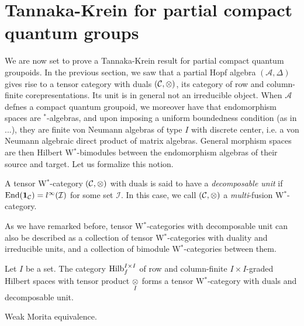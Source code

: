 \section{Tannaka-Krein for partial compact quantum groups}



We are now set to prove a Tannaka-Krein result for partial compact quantum groupoids. In the previous section, we saw that a partial Hopf algebra $(\mathscr{A},\Delta)$ gives rise to a tensor category with duals $(\mathcal{C},\otimes)$, its category of row and column-finite corepresentations. Its unit is in general not an irreducible object. When $\mathscr{A}$ defnes a compact quantum groupoid, we moreover have that endomorphism spaces are $^*$-algebras, and upon imposing a uniform boundedness condition (as in ...), they are finite von Neumann algebras of type $I$ with discrete center, i.e. a von Neumann algebraic direct product of matrix algebras. General morphism spaces are then Hilbert W$^*$-bimodules between the endomorphism algebras of their source and target. Let us formalize this notion. %


\begin{Def} A tensor W$^*$-category $(\mathcal{C},\otimes)$ with duals is said to have a \emph{decomposable unit} if $\operatorname{\mathrm{End}}(\mathbf{1}_{\mathcal{C}}) = l^{\infty}(\mathcal{I})$ for some set $\mathcal{I}$. In this case, we call $(\mathcal{C},\otimes)$ a \emph{multi}-fusion W$^*$-category. %
\end{Def}

As we have remarked before, tensor W$^*$-categories with decomposable unit can also be described as a collection of tensor W$^*$-categories with duality and irreducible units, and a collection of bimodule W$^*$-categories between them. 

\begin{Exa} Let $I$ be a set. The category $\mathrm{Hilb}_f^{I\times I}$ of row and column-finite $I\times I$-graded Hilbert spaces with tensor product $\underset{I}{\otimes}$ forms a tensor W$^*$-category with duals and decomposable unit. 
\end{Exa}

\begin{Exa} Weak Morita equivalence. 
\end{Exa}

